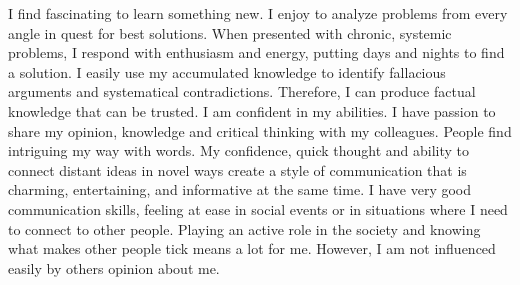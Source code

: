 \documentclass[a4paper,notitlepage,11pt]{article}
\begin{document}
\newpage
\thispagestyle{empty}
\noindent
\begin{minipage}[t]{.6\textwidth}
   \vspace{0.1cm}
   \color{myblack}
   
\end{minipage}%
\quad
\quad
{}
\vspace{-0.8cm}
\small
I find fascinating to learn something new. I enjoy to analyze problems from
every angle in quest for best solutions. When presented with chronic, systemic
problems, I respond with enthusiasm and energy, putting days and nights to find
a solution. I easily use my accumulated knowledge to identify fallacious
arguments and systematical contradictions. Therefore, I can produce factual
knowledge that can be trusted. I am confident in my abilities. I have passion
to share my opinion, knowledge and critical thinking with my colleagues. People
find intriguing my way with words. My confidence, quick thought and ability to
connect distant ideas in novel ways create a style of communication that is
charming, entertaining, and informative at the same time. I have very good
communication skills, feeling at ease in social events or in situations where I
need to connect to other people. Playing an active role in the society and
knowing what makes other people tick means a lot for me. However, I am not
influenced easily by others opinion about me.
\end{document}
